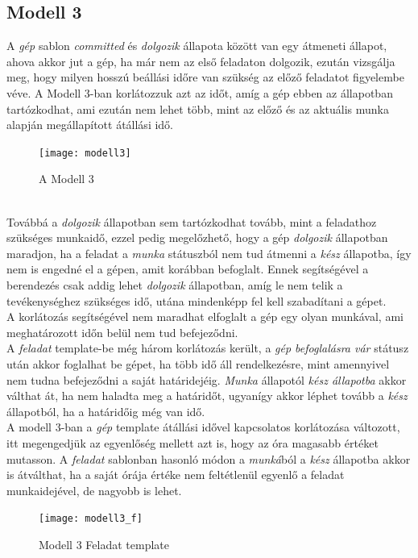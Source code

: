 \documentclass [12pt]{report}
\begin{document}
\subsection{Modell 3}
A \emph{gép} sablon \emph{committed} és \emph{dolgozik} állapota között van egy átmeneti állapot, ahova akkor jut a gép, ha már nem az első feladaton dolgozik, ezután vizsgálja meg, hogy milyen hosszú beállási időre van szükség az előző feladatot figyelembe véve. A Modell 3-ban korlátozzuk azt az időt, amíg a gép ebben az állapotban tartózkodhat, ami ezután nem lehet több, mint az előző és az aktuális munka alapján megállapított átállási idő. \\
 \begin{figure}[htpb]
    \begin{center}
   \texttt{[image: modell3]}\\
    \caption{A Modell 3}
    \end{center}
    \end{figure}\\
Továbbá a \emph{dolgozik} állapotban sem tartózkodhat tovább, mint a feladathoz szükséges munkaidő, ezzel pedig megelőzhető, hogy a gép \emph{dolgozik} állapotban maradjon, ha a feladat a \emph{munka} státuszból nem tud átmenni a \emph{kész} állapotba, így nem is engedné el a gépen, amit korábban befoglalt. Ennek segítségével a berendezés csak addig lehet \emph{dolgozik} állapotban, amíg le nem telik a tevékenységhez szükséges idő, utána mindenképp fel kell szabadítani a gépet.\\
A korlátozás segítségével nem maradhat elfoglalt a gép egy olyan munkával, ami meghatározott időn belül nem tud befejeződni. \\
A \emph{feladat} template-be még három korlátozás került, a \emph{gép befoglalásra vár} státusz után akkor foglalhat be gépet, ha több idő áll rendelkezésre, mint amennyivel nem tudna befejeződni a saját határidejéig. \emph{Munka} állapotól \emph{kész állapotba} akkor válthat át, ha nem haladta meg a határidőt, ugyanígy akkor léphet tovább a \emph{kész} állapotból, ha a határidőig még van idő.\\
A modell 3-ban a \emph{gép} template átállási idővel kapcsolatos korlátozása változott, itt megengedjük az egyenlőség mellett azt is, hogy az óra magasabb értéket mutasson. A \emph{feladat} sablonban hasonló módon a \emph{munká}ból a \emph{kész} állapotba akkor is átválthat, ha a saját órája értéke nem feltétlenül egyenlő a feladat munkaidejével, de nagyobb is lehet.
\begin{figure}[htpb]
    \begin{center}
   \texttt{[image: modell3\_f]}\\
    \caption{Modell 3 Feladat template}
    \end{center}
    \end{figure}
\end{document}
